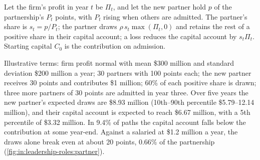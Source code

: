 \begin{method}\label{met:in:leadership-roles:partner}
Let the firm's profit in year $t$ be $\Pi_t$, and let the new partner hold $p$ of the partnership's $P_t$ points, with
$P_t$ rising when others are admitted. The partner's share is $s_t=p/P_t$; the partner draws $\rho\,s_t\max(\Pi_t,0)$ and
retains the rest of a positive share in their capital account; a loss reduces the capital account by $s_t\Pi_t$. Starting
capital $C_0$ is the contribution on admission.
\end{method}

\begin{example}\label{ex:in:leadership-roles:partner}
Illustrative terms: firm profit normal with mean \$300 million and standard deviation \$200 million a year; 30 partners
with 100 points each; the new partner receives 30 points and contributes \$1 million; 60\% of each positive share is
drawn; three more partners of 30 points are admitted in year three. Over five years the new partner's expected draws are
\$8.93 million (10th--90th percentile \$5.79--12.14 million), and their capital account is expected to reach \$6.67
million, with a 5th percentile of \$3.32 million. In 9.4\% of paths the capital account falls below the contribution at
some year-end. Against a salaried  at \$1.2 million a year, the draws alone break even at about 20 points,
0.66\% of the partnership (\cref{fig:in:leadership-roles:partner}).
\end{example}

